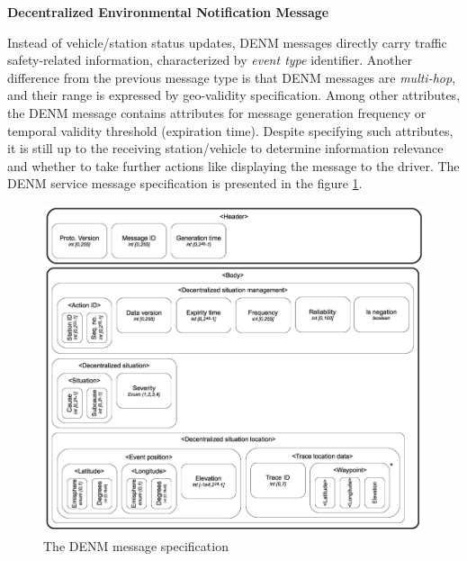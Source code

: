 \documentclass[0main.tex]{subfiles}
\begin{document}
\textbf{Decentralized Environmental Notification Message}

Instead of vehicle/station status updates, DENM messages directly carry traffic safety-related 
information, characterized by \emph{event type} identifier. Another difference from the previous 
message type is that DENM messages are \emph{multi-hop}, and their range is expressed by geo-validity 
specification. Among other attributes, the DENM message contains attributes for message generation 
frequency or temporal validity threshold (expiration time). Despite specifying such 
attributes, it is still up to the receiving station/vehicle to determine information relevance
\cite{ETSI2019} and whether to take further actions like displaying the message to the driver.
The DENM service message specification is presented in the figure \ref{denm-spec}.

\begin{figure}[htbp]
    \centering
    \includegraphics[width=.9\textwidth]{denm-spec.png}
    \caption{The DENM message specification \cite{Santa2013}}
    \label{denm-spec}
\end{figure}
\end{document}
